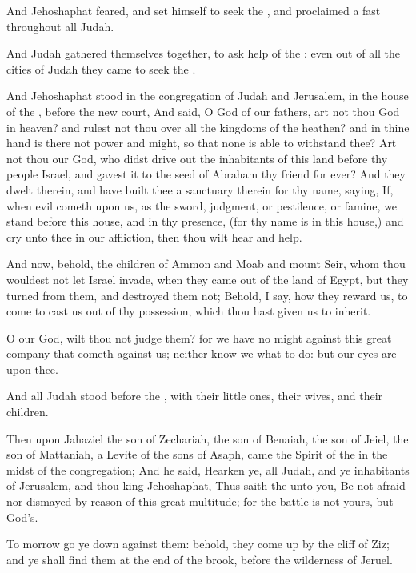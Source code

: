 \verse And Jehoshaphat feared, and set himself to seek the \LORD, and proclaimed a fast throughout all Judah.

\verse And Judah gathered themselves together, to ask help of the \LORD: even out of all the cities of Judah they came to seek the \LORD.

\verse And Jehoshaphat stood in the congregation of Judah and Jerusalem, in the house of the \LORD, before the new court, \verse And said, O \LORD God of our fathers, art not thou God in heaven? and rulest not thou over all the kingdoms of the heathen? and in thine hand is there not power and might, so that none is able to withstand thee?  \verse Art not thou our God, who didst drive out the inhabitants of this land before thy people Israel, and gavest it to the seed of Abraham thy friend for ever?  \verse And they dwelt therein, and have built thee a sanctuary therein for thy name, saying, \verse If, when evil cometh upon us, as the sword, judgment, or pestilence, or famine, we stand before this house, and in thy presence, (for thy name is in this house,) and cry unto thee in our affliction, then thou wilt hear and help.

\verse And now, behold, the children of Ammon and Moab and mount Seir, whom thou wouldest not let Israel invade, when they came out of the land of Egypt, but they turned from them, and destroyed them not; \verse Behold, I say, how they reward us, to come to cast us out of thy possession, which thou hast given us to inherit.

\verse O our God, wilt thou not judge them? for we have no might against this great company that cometh against us; neither know we what to do: but our eyes are upon thee.

\verse And all Judah stood before the \LORD, with their little ones, their wives, and their children.

\verse Then upon Jahaziel the son of Zechariah, the son of Benaiah, the son of Jeiel, the son of Mattaniah, a Levite of the sons of Asaph, came the Spirit of the \LORD in the midst of the congregation; \verse And he said, Hearken ye, all Judah, and ye inhabitants of Jerusalem, and thou king Jehoshaphat, Thus saith the \LORD unto you, Be not afraid nor dismayed by reason of this great multitude; for the battle is not yours, but God's.

\verse To morrow go ye down against them: behold, they come up by the cliff of Ziz; and ye shall find them at the end of the brook, before the wilderness of Jeruel.

